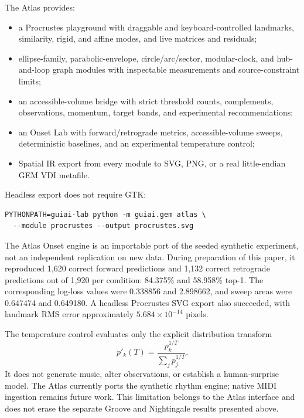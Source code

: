 \documentclass[11pt,a4paper]{article}
\begin{document}
The Atlas provides:
\begin{itemize}[nosep]
  \item a Procrustes playground with draggable and keyboard-controlled landmarks, similarity, rigid, and affine modes, and live matrices and residuals;
  \item ellipse-family, parabolic-envelope, circle/arc/sector, modular-clock, and hub-and-loop graph modules with inspectable measurements and source-constraint limits;
  \item an accessible-volume bridge with strict threshold counts, complements, observations, momentum, target bands, and experimental recommendations;
  \item an Onset Lab with forward/retrograde metrics, accessible-volume sweeps, deterministic baselines, and an experimental temperature control;
  \item Spatial IR export from every module to SVG, PNG, or a real little-endian GEM VDI metafile.
\end{itemize}
Headless export does not require GTK:
\begin{lstlisting}
PYTHONPATH=guiai-lab python -m guiai.gem atlas \
  --module procrustes --output procrustes.svg
\end{lstlisting}

The Atlas Onset engine is an importable port of the seeded synthetic experiment, not an independent replication on new data. During preparation of this paper, it reproduced 1,620 correct forward predictions and 1,132 correct retrograde predictions out of 1,920 per condition: 84.375\% and 58.958\% top-1. The corresponding log-loss values were 0.338856 and 2.898662, and sweep areas were 0.647474 and 0.649180. A headless Procrustes SVG export also succeeded, with landmark RMS error approximately $5.684\times10^{-14}$ pixels.

The temperature control evaluates only the explicit distribution transform
\begin{equation}
p'_k(T)=\frac{p_k^{1/T}}{\sum_j p_j^{1/T}}.
\label{eq:atlas-temperature}
\end{equation}
It does not generate music, alter observations, or establish a human-surprise model. The Atlas currently ports the synthetic rhythm engine; native MIDI ingestion remains future work. This limitation belongs to the Atlas interface and does not erase the separate Groove and Nightingale results presented above.
\end{document}
